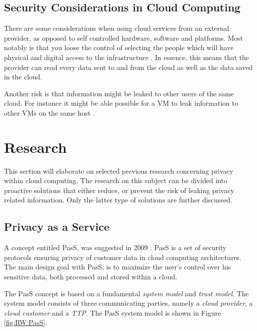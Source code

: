\documentclass[pdftex,english,10pt,b5paper,twoside]{book}
\begin{document}
\subsection{Security Considerations in Cloud Computing}

There are some considerations when using cloud services from an external
provider, as opposed to self controlled hardware, software and platforms. Most
notably is that you loose the control of selecting the people which will have
physical and digital access to the infrastructure \cite{cloud_getoff}. In
essence, this means that the provider can read every data sent to and from the
cloud as well as the data saved in the cloud.

Another risk is that information might be leaked to other users of the same
cloud. For instance it might be able possible for a \ac{VM} to leak information
to other \acp{VM} on the same host \cite{cloud_getoff}.

\section{Research}
\label{sec:research}

This section will elaborate on selected previous research concerning privacy
within cloud computing. The research on this subject can be divided into
proactive solutions that either reduce, or prevent the risk of leaking privacy
related information. Only the latter type of solutions are further discussed.

\subsection{Privacy as a Service}

A concept entitled \ac{PasS}, was suggested in 2009 \cite{PasS}. \ac{PasS} is a set
of security protocols ensuring privacy of customer data in cloud computing
architectures. The main design goal with \ac{PasS}, is to maximize the user's control
over his sensitive data, both processed and stored within a cloud.

The \ac{PasS} concept is based on a fundamental \emph{system model} and \emph{trust
model}. The system model consists of three communicating parties, namely a
\emph{cloud provider}, a \emph{cloud customer} and a \emph{\ac{TTP}}. The
\ac{PasS} system model is shown in Figure \ref{fig:RW:PasS}.
\end{document}
